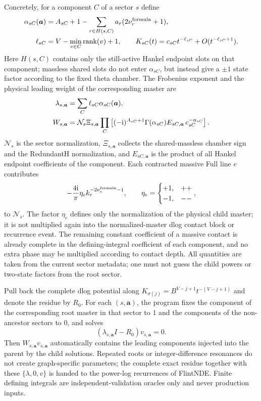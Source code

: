 \documentclass[11pt,a4paper]{article}
\newcommand{\ii}{\mathrm i}
\newcommand{\cN}{\mathcal N}
\begin{document}
Concretely, for a component $C$ of a sector $s$ define
\begin{align}
 \alpha_{sC}(\bm a)&=A_{sC}+1-
 \sum_{r\in H(s,C)}a_r(2\nu_r^{\rm formula}+1),
 \notag\\
 \ell_{sC}&=V-\min_{v\in C}\operatorname{rank}(v)+1,
 \qquad
 K_{sC}(t)=c_{sC}t^{-\ell_{sC}}+O(t^{-\ell_{sC}+1}).
 \label{eq:generic-sector-boundary-component}
\end{align}
Here $H(s,C)$ contains only the still-active Hankel endpoint slots on that component; massless shared slots do not enter $\alpha_{sC}$, but instead give a $\pm1$ state factor according to the fixed theta chamber. The Frobenius exponent and the physical leading weight of the corresponding master are
\begin{align}
 \lambda_{s,\bm a}&=\sum_C\ell_{sC}\alpha_{sC}(\bm a),
 \notag\\
 W_{s,\bm a}&=\cN_s\Xi_{s,\bm a}
 \prod_C\left[
 (-\ii)^{A_{sC}+1}\Gamma(\alpha_{sC})
 E_{sC,\bm a}\,c_{sC}^{-\alpha_{sC}}
 \right].
 \label{eq:generic-sector-boundary-weight}
\end{align}
$\cN_s$ is the sector normalization, $\Xi_{s,\bm a}$ collects the shared-massless chamber sign and the RedundantH normalization, and $E_{sC,\bm a}$ is the product of all Hankel endpoint coefficients of the component. Each contracted massive Full line $e$ contributes
\begin{equation}
 -\frac{4\ii}{\pi}\eta_e k_e^{-2\nu_e^{\rm formula}-1},
 \qquad
 \eta_e=\begin{cases}+1,&++\\-1,&--\end{cases},
 \label{eq:massive-full-pinch-normalization}
\end{equation}
to $\cN_s$. The factor $\eta_e$ defines only the normalization of the physical child master; it is not multiplied again into the normalized-master dlog contact block or recurrence event. The remaining constant coefficient of a massive contact is already complete in the defining-integral coefficient of each component, and no extra phase may be multiplied according to contact depth. All quantities are taken from the current sector metadata; one must not guess the child powers or two-state factors from the root sector.

Pull back the complete dlog potential along $K_{\sigma(j)}=B^{V-j+1}t^{-(V-j+1)}$ and denote the residue by $R_0$. For each $(s,\bm a)$, the program fixes the component of the corresponding root master in that sector to $1$ and the components of the non-ancestor sectors to $0$, and solves
\begin{equation}
 (\lambda_{s,\bm a}I-R_0)v_{s,\bm a}=0.
 \label{eq:generic-sector-indicial-vector}
\end{equation}
Then $W_{s,\bm a}v_{s,\bm a}$ automatically contains the leading components injected into the parent by the child solutions. Repeated roots or integer-difference resonances do not create graph-specific parameters; the complete exact residue together with these $\{\lambda,0,v\}$ is handed to the power-log recurrences of FlintNDE. Finite defining integrals are independent-validation oracles only and never production inputs.
\end{document}
